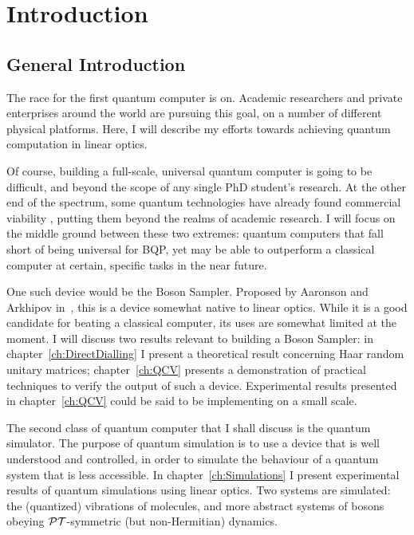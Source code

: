 \chapter{Introduction}
\label{ch:Introduction}
\section{General Introduction}
\label{sec:Science}
The race for the first quantum computer is on. Academic researchers and private
enterprises \cite{dwave} around the world are pursuing this goal, on a number of
different physical platforms. Here, I will describe my efforts towards achieving
quantum computation in linear optics.

Of course, building a full-scale, universal quantum computer is going to be
difficult, and beyond the scope of any single PhD student's research. At the
other end of the spectrum, some quantum technologies have already found
commercial viability \cite{idquantique,magiq,qutools}, putting them beyond 
the realms of academic research. I will focus on the middle ground between
these two extremes: quantum computers that fall short of being universal for
BQP, yet may be able to outperform a classical computer at certain, specific tasks in the near future.

One such device would be the Boson Sampler. Proposed by Aaronson and Arkhipov
in~\cite{bosonsampling}, this is a device somewhat native to linear optics.
While it is
a good candidate for beating a classical computer, its uses are somewhat limited
at the moment. I will discuss two results relevant to building a Boson Sampler:
in chapter~\ref{ch:DirectDialling} I present a theoretical result concerning
Haar random unitary matrices; chapter~\ref{ch:QCV} presents a demonstration of
practical techniques to verify the output of such a device. Experimental results
presented in chapter~\ref{ch:QCV} could be said to be implementing
\bosonsampling{} on a small scale.

The second class of quantum computer that I shall discuss is the quantum
simulator. The purpose of quantum simulation is to use a device that is well
understood and controlled, in order to simulate the behaviour of a quantum
system that is less accessible. In chapter~\ref{ch:Simulations} I present
experimental results of quantum simulations using linear optics. Two systems are
simulated: the (quantized) vibrations of molecules, and more abstract systems of
bosons obeying \(\mathcal{PT}\)-symmetric (but non-Hermitian) dynamics.

